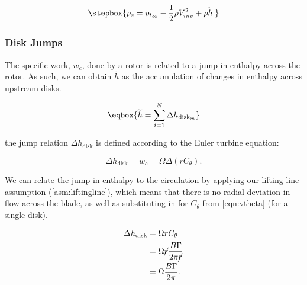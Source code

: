 \begin{equation}
    \label{eqn:staticpressure}
    \stepbox{
    p_s = p_{t_\infty} - \frac{1}{2}\rho V_{inv}^2 + \rho \widetilde{h}.
}
\end{equation}


\subsubsection{Disk Jumps}
\label{ssec:diskjumps}

The specific work, \(w_c\), done by a rotor is related to a jump in enthalpy across the rotor.
%
As such, we can obtain \(\widetilde{h}\) as the accumulation of changes in enthalpy across upstream disks.

\begin{equation}
    \label{eqn:hjump}
    \eqbox{\widetilde{h} = \sum_{i=1}^N \Delta h_{\text{disk}_m}} \\
\end{equation}

\where the jump relation \(\Delta h_{\text{disk}}\) is defined according to the Euler turbine equation:

\begin{equation}
    \label{eqn:hjumprel}
    \Delta h_{\text{disk}} = w_c = \Omega \Delta(r C_\theta).
\end{equation}

\noindent We can relate the jump in enthalpy to the circulation by applying our lifting line assumption (\cref{asm:liftingline}),
which means that there is no radial deviation in flow across the blade, as well as substituting in for \(C_\theta\) from \cref{eqn:vtheta} (for a single disk).

\begin{equation}
\label{eqn:hjumprel}
    \begin{aligned}
    \Delta h_{\text{disk}} &= \Omega r C_\theta \\
                           &= \Omega \cancel{r} \frac{B\Gamma}{2\pi \cancel{r}} \\
                           &= \Omega \frac{B\Gamma}{2\pi}.
    \end{aligned}
\end{equation}




